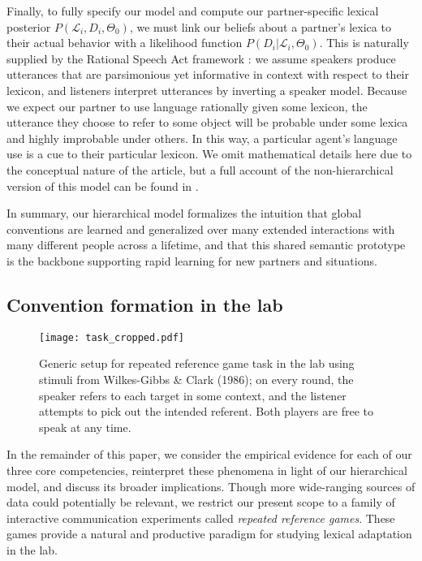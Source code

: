 \documentclass[11pt, floatsintext, jou]{apa6}
\begin{document}
Finally, to fully specify our model and compute our partner-specific lexical posterior $P(\mathcal{L}_i, D_i, \Theta_0)$, we must link our beliefs about a partner's lexica to their actual behavior with a likelihood function $P(D_i | \mathcal{L}_i, \Theta_0)$. This is naturally supplied by the Rational Speech Act framework \cite{FrankGoodman12_PragmaticReasoningLanguageGames,GoodmanFrank16_RSATiCS,BergenLevyGoodman16_LexicalUncertainty,SmithGoodmanFrank13_RecursivePragmaticReasoningNIPS}: we assume speakers produce utterances that are parsimonious yet informative in context with respect to their lexicon, and listeners interpret utterances by inverting a speaker model. Because we expect our partner to use language rationally given some lexicon, the utterance they choose to refer to some object will be probable under some lexica and highly improbable under others. In this way, a particular agent's language use is a cue to their particular lexicon. We omit mathematical details here due to the conceptual nature of the article, but a full account of the non-hierarchical version of this model can be found in .

In summary, our hierarchical model formalizes the intuition that global conventions are learned and generalized over many extended interactions with many different people across a lifetime, and that this shared semantic prototype is the backbone supporting rapid learning for new partners and situations. 

\subsection{Convention formation in the lab}

\begin{figure*}[t!]
\centering
\texttt{[image: task\_cropped.pdf]}
\caption{Generic setup for repeated reference game task in the lab using stimuli from Wilkes-Gibbs \& Clark (1986); on every round, the speaker refers to each target in some context, and the listener attempts to pick out the intended referent. Both players are free to speak at any time.}
\label{fig:example}
\end{figure*}

In the remainder of this paper, we consider the empirical evidence for each of our three core competencies, reinterpret these phenomena in light of our hierarchical model, and discuss its broader implications. Though more wide-ranging sources of data could potentially be relevant, we restrict our present scope to a family of interactive communication experiments called \emph{repeated reference games}. These games provide a natural and  productive paradigm for studying lexical adaptation in the lab. 
\end{document}
